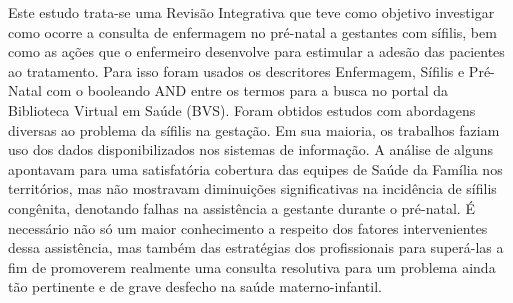 Este estudo trata-se uma Revisão Integrativa que teve como objetivo investigar como ocorre a consulta de enfermagem no pré-natal a gestantes com sífilis, bem como as ações que o enfermeiro desenvolve para estimular a adesão das pacientes ao tratamento. Para isso foram usados os descritores Enfermagem, Sífilis e Pré-Natal com o booleando AND entre os termos para a busca no portal da Biblioteca Virtual em Saúde (BVS). Foram obtidos estudos com abordagens diversas ao problema da sífilis na gestação. Em sua maioria, os trabalhos faziam uso dos dados disponibilizados nos sistemas de informação. A análise de alguns apontavam para uma satisfatória cobertura das equipes de Saúde da Família nos territórios, mas não mostravam diminuições significativas na incidência de sífilis congênita, denotando falhas na assistência a gestante durante o pré-natal. É necessário não só um maior conhecimento a respeito dos fatores intervenientes dessa assistência, mas também das estratégias dos profissionais para superá-las a fim de promoverem realmente uma consulta resolutiva para um problema ainda tão pertinente e de grave desfecho na saúde materno-infantil. 

